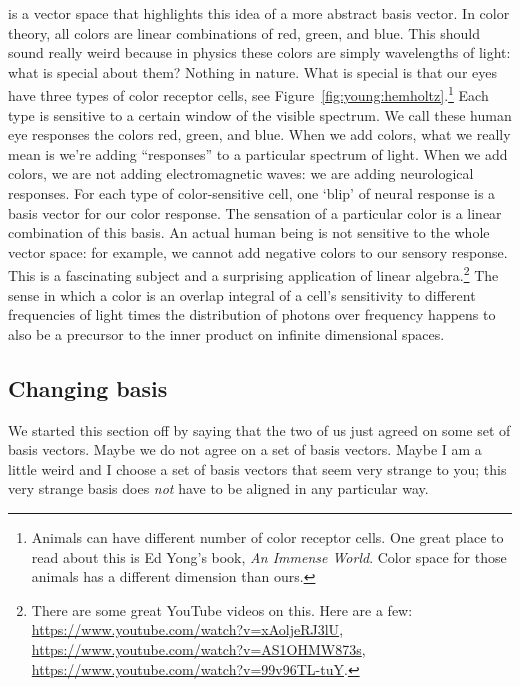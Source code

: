 \begin{example}\label{eg:color:space} is a vector space that highlights this idea of a more abstract basis vector. In color theory, all colors are linear combinations of red, green, and blue. This should sound really weird because in physics these colors are simply wavelengths of light: what is special about them? Nothing in nature. What is special is that our eyes have three types of color receptor cells, see Figure~\ref{fig:young:hemholtz}.\footnote{Animals can have different number of color receptor cells. One great place to read about this is Ed Yong's book, \emph{An Immense World}. Color space for those animals has a different dimension than ours.} Each type is sensitive to a certain window of the visible spectrum. We call these human eye responses the colors red, green, and blue. When we add colors, what we really mean is we're adding ``responses'' to a particular spectrum of light. When we add colors, we are not adding electromagnetic waves: we are adding neurological responses. For each type of color-sensitive cell, one `blip' of neural response is a basis vector for our color response. The sensation of a particular color is a linear combination of this basis. An actual human being is not sensitive to the whole vector space: for example, we cannot add negative colors to our sensory response. This is a fascinating subject and a surprising application of linear algebra.\footnote{There are some great YouTube videos on this. Here are a few: \url{https://www.youtube.com/watch?v=xAoljeRJ3lU}, \url{https://www.youtube.com/watch?v=AS1OHMW873s}, \url{https://www.youtube.com/watch?v=99v96TL-tuY}.} The sense in which a color is an overlap integral of a cell's sensitivity to different frequencies of light times the distribution of photons over frequency happens to also be a precursor to the inner product on infinite dimensional spaces.
\end{example}



\subsection{Changing basis} 
\label{sec:sub:basis:changing}

We started this section off by saying that the two of us just agreed on some set of basis vectors. Maybe we do not agree on a set of basis vectors. Maybe I am a little weird and I choose a set of basis vectors that seem very strange to you; this very strange basis does \emph{not} have to be aligned in any particular way. 

